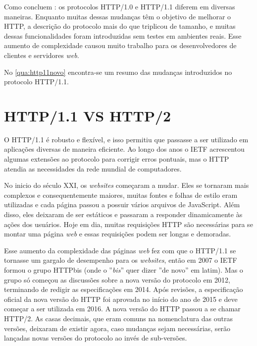 Como concluem : os protocolos HTTP/1.0 e HTTP/1.1 diferem em diversas maneiras. Enquanto muitas dessas mudanças têm o objetivo de melhorar o HTTP, a descrição do protocolo mais do que triplicou de tamanho, e muitas dessas funcionalidades foram introduzidas sem testes em ambientes reais. Esse aumento de complexidade causou muito trabalho para os desenvolvedores de clientes e servidores \textit{web}. 

No \autoref{qua:http11novo} encontra-se um resumo das mudanças introduzidos no protocolo HTTP/1.1.



\section{HTTP/1.1 VS HTTP/2}
\label{sec:http_11_vs_http_2}

O HTTP/1.1 é robusto e flexível, e isso permitiu que passasse a ser utilizado em aplicações diversas de maneira eficiente. Ao longo dos anos o IETF acrescentou algumas extensões ao protocolo para corrigir erros pontuais, mas o HTTP atendia as necessidades da rede mundial de computadores.

No inicio do século XXI, os \textit{websites} começaram a mudar. Eles se tornaram mais complexos e consequentemente maiores, muitas fontes e folhas de estilo eram utilizadas e cada página passou a possuir vários arquivos de JavaScript. Além disso, eles deixaram de ser estáticos e passaram a responder dinamicamente às ações dos usuários. Hoje em dia, muitas requisições HTTP são necessárias para se montar uma página \textit{web} e essas requisições podem ser longas e demoradas.

Esse aumento da complexidade das páginas \textit{web} fez com que o HTTP/1.1 se tornasse um gargalo de desempenho para os \textit{websites}, então em 2007 o IETF formou o grupo HTTPbis (onde o ''\textit{bis}'' quer dizer ''de novo'' em latim). Mas o grupo só começou as discussões sobre a nova versão do protocolo em 2012, terminando de redigir as especificações em 2014. Após revisões, a especificação oficial da nova versão do HTTP foi aprovada no início do ano de 2015 e deve começar a ser utilizada em 2016. A nova versão do HTTP passou a se chamar HTTP/2. As casas decimais, que eram comuns na nomenclatura das outras versões, deixaram de existir agora, caso mudanças sejam necessárias, serão lançadas novas versões do protocolo ao invés de sub-versões.\cite{webPageGrowth}

